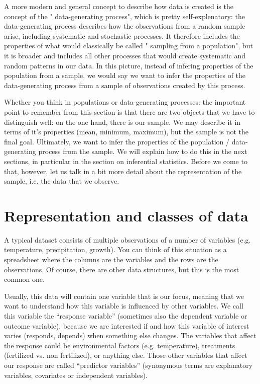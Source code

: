 \documentclass[a4paper,twoside]{tufte-book}\usepackage[]{graphicx}\usepackage[]{color}
\begin{document}
 A more modern and general concept to describe how data is created is the concept of the " data-generating process", which is pretty self-explenatory: the data-generating process describes how the observations from a random sample arise, including systematic and stochastic processes. It therefore includes the properties of what would classically be called " sampling from a population", but it is broader and includes all other processes that would create systematic and random patterns in our data. In this picture, instead of infering properties of the population from a sample, we would say we want to infer the properties of the data-generating process from a sample of observations created by this process.

Whether you think in populations or data-generating processes: the important point to remember from this section is that there are two objects that we have to distinguish well: on the one hand, there is our sample. We may describe it in terms of it's properties (mean, minimum, maximum), but the sample is not the final goal. Ultimately, we want to infer the properties of the population / data-generating process from the sample. We will explain how to do this in the next sections, in particular in the section on inferential statistics. Before we come to that, however, let us talk in a bit more detail about the representation of the sample, i.e. the data that we observe.

\section{Representation and classes of data}

A typical dataset consists of multiple observations of a number of variables (e.g. temperature, precipitation, growth). You can think of this situation as a spreadsheet where the columns are the variables and the rows are the observations. Of course, there are other data structures, but this is the most common one.

Usually, this data will contain one variable that is our focus, meaning that we want to understand how this variable is influenced by other variables.  We call this variable the ``response variable'' (sometimes also the dependent variable or outcome variable), because we are interested if and how this variable of interest varies (responds, depends) when something else changes. The variables that affect the response could be environmental factors (e.g. temperature), treatments (fertilized vs. non fertilized), or anything else.  Those other variables that affect our response are called ``predictor variables'' (synonymous terms are explanatory variables, covariates or independent variables). 
\end{document}
